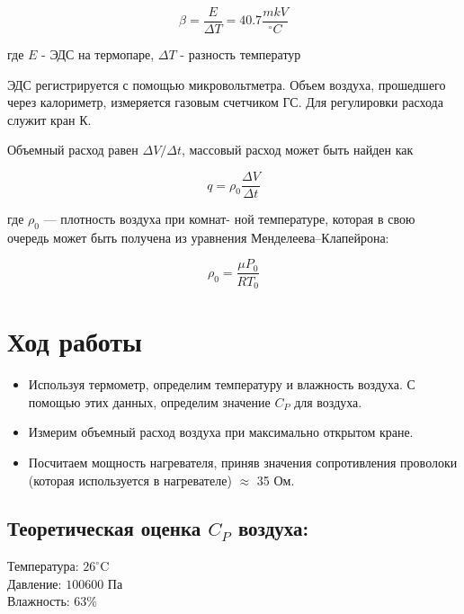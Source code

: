 \documentclass[a4paper,17pt]{article}
\begin{document}
    \begin{equation}
        \beta = \frac{E}{\Delta T} = 40.7 \frac{mkV}{^\circ C} \label{betta}
    \end{equation}
    
    \begin{center}
        где $E$ - ЭДС на термопаре, $\Delta T$ - разность температур    
    \end{center}
    
    ЭДС регистрируется с помощью микровольтметра. Объем воздуха, прошедшего через калориметр, измеряется газовым счетчиком ГС. Для регулировки расхода служит кран К.
    
    Объемный расход равен $\Delta V/ \Delta t$, массовый расход может быть найден как
    
    \begin{equation}
        q=\rho_0\frac{\Delta V}{\Delta t}\label{rash}
    \end{equation}
    
    где $\rho_0$ — плотность воздуха при комнат- ной температуре, которая в свою очередь может быть получена из уравнения Менделеева–Клапейрона:
    
    \begin{equation}
        \rho_0=\frac{\mu P_0}{RT_0}\label{rho}
    \end{equation}
          
\section{Ход работы}

    \begin{itemize}
        \item Используя термометр, определим температуру и влажность воздуха. С помощью этих данных, определим значение $C_P$ для воздуха.
        \item Измерим объемный расход воздуха при максимально открытом кране.
        \item Посчитаем мощность нагревателя, приняв значения сопротивления проволоки (которая используется в нагревателе) $\approx$ 35 Ом.
    \end{itemize}
        
    \subsection{Теоретическая оценка $C_P$ воздуха:}
        Температура: $26^\circ$C\\
        Давление: $100600$ Па\\
        Влажность: 63\%
        
\end{document}
